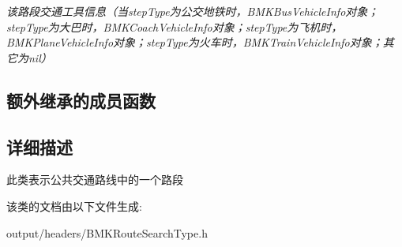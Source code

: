 \begin{DoxyCompactItemize}
\begin{DoxyCompactList}\small\item\em 该路段交通工具信息（当step\+Type为公交地铁时，\+B\+M\+K\+Bus\+Vehicle\+Info对象；step\+Type为大巴时，\+B\+M\+K\+Coach\+Vehicle\+Info对象；step\+Type为飞机时，\+B\+M\+K\+Plane\+Vehicle\+Info对象；step\+Type为火车时，\+B\+M\+K\+Train\+Vehicle\+Info对象；其它为nil） \end{DoxyCompactList}\end{DoxyCompactItemize}
\subsection*{额外继承的成员函数}


\subsection{详细描述}
此类表示公共交通路线中的一个路段 

该类的文档由以下文件生成\+:\begin{DoxyCompactItemize}
\item 
output/headers/B\+M\+K\+Route\+Search\+Type.\+h\end{DoxyCompactItemize}
